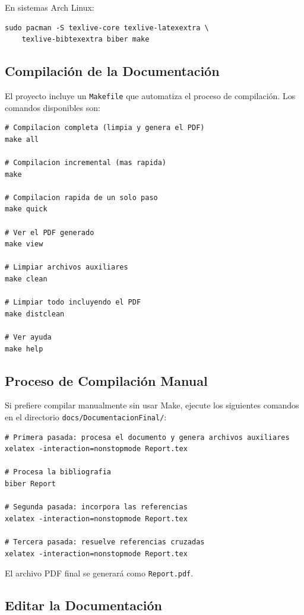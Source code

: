 En sistemas Arch Linux:

\begin{lstlisting}[style=bash]
sudo pacman -S texlive-core texlive-latexextra \
    texlive-bibtexextra biber make
\end{lstlisting}

\subsection{Compilación de la Documentación}

El proyecto incluye un \texttt{Makefile} que automatiza el proceso de compilación. Los comandos disponibles son:

\begin{lstlisting}[style=bash]
# Compilacion completa (limpia y genera el PDF)
make all

# Compilacion incremental (mas rapida)
make

# Compilacion rapida de un solo paso
make quick

# Ver el PDF generado
make view

# Limpiar archivos auxiliares
make clean

# Limpiar todo incluyendo el PDF
make distclean

# Ver ayuda
make help
\end{lstlisting}

\subsection{Proceso de Compilación Manual}

Si prefiere compilar manualmente sin usar Make, ejecute los siguientes comandos en el directorio \texttt{docs/DocumentacionFinal/}:

\begin{lstlisting}[style=bash]
# Primera pasada: procesa el documento y genera archivos auxiliares
xelatex -interaction=nonstopmode Report.tex

# Procesa la bibliografia
biber Report

# Segunda pasada: incorpora las referencias
xelatex -interaction=nonstopmode Report.tex

# Tercera pasada: resuelve referencias cruzadas
xelatex -interaction=nonstopmode Report.tex
\end{lstlisting}

El archivo PDF final se generará como \texttt{Report.pdf}.

\subsection{Editar la Documentación}

